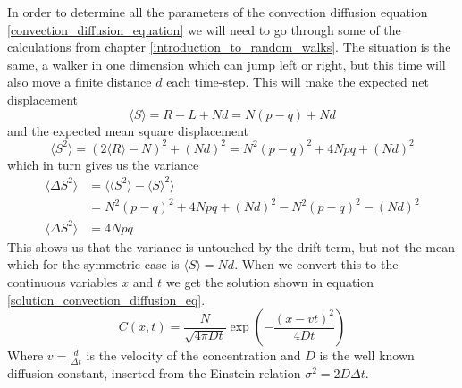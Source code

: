In order to determine all the parameters of the convection diffusion equation \eqref{convection_diffusion_equation} we will need to go through some of the calculations from chapter \ref{introduction_to_random_walks}. 
The situation is the same, a walker in one dimension which can jump left or right, but this time will also move a finite distance $d$ each time-step. 
This will make the expected net displacement
\begin{equation*}
 \langle S\rangle = R-L +Nd = N(p-q) + Nd
\end{equation*}
and the expected mean square displacement
\begin{equation*}
 \langle S^2\rangle = (2\langle R\rangle -N)^2 +(Nd)^2 = N^2(p-q)^2 +4Npq +(Nd)^2
\end{equation*}
which in turn gives us the variance
\begin{align*}
 \langle \Delta S^2\rangle &= \langle\langle S^2\rangle-\langle S\rangle^2\rangle \\
 &= N^2(p-q)^2 +4Npq +(Nd)^2 - N^2(p-q)^2 -(Nd)^2 \\
\langle \Delta S^2\rangle &= 4Npq
\end{align*}
This shows us that the variance is untouched by the drift term, but not the mean which for the symmetric case is $\langle S\rangle = Nd$. 
When we convert this to the continuous variables $x$ and $t$ we get the solution shown in equation \ref{solution_convection_diffusion_eq}.
\begin{equation}\label{solution_convection_diffusion_eq}
 C(x,t) = \frac{N}{\sqrt{4\pi Dt}}\exp\left(-\frac{(x-vt)^2}{4Dt}\right)
\end{equation}
Where $v = \frac{d}{\Delta t}$ is the velocity of the concentration and $D$ is the well known diffusion constant, inserted from the Einstein relation $\sigma^2 = 2D\Delta t$.\\


